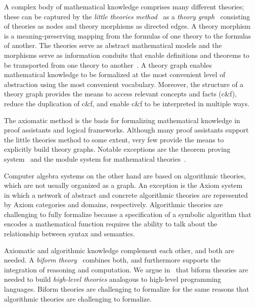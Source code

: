 \documentclass[fleqn]{llncs}
\begin{document}
A complex body of mathematical knowledge comprises many different
theories; these can be captured by the
\emph{little theories method}~\cite{FarmerEtAl92b} as a \emph{theory
  graph}~\cite{Kohlhase14} consisting of theories as nodes and theory
morphisms as directed edges.  A theory morphism is a
meaning-preserving mapping from the formulas of one theory to the
formulas of another.  The theories serve as abstract
mathematical models and the morphisms serve as information
conduits that enable definitions and theorems to be transported
from one theory to another~\cite{BarwiseSeligman97}.  A theory graph enables
mathematical knowledge to be formalized at the most convenient level
of abstraction using the most convenient vocabulary.  Moreover, the
structure of a theory graph provides the means to access relevant
concepts and facts (c\&f), reduce the duplication of c\&f, and
enable c\&f to be interpreted in multiple ways.

The axiomatic method is the basis for formalizing mathematical
knowledge in proof assistants and logical frameworks.  Although many
proof assistants support the little theories method to some extent,
very few provide the means to explicitly build theory graphs.  Notable
exceptions are the {\imps} theorem proving system~\cite{FarmerEtAl93}
and the {\mmt} module system for mathematical
theories~\cite{RabeKohlhase13}.

Computer algebra systems on the other hand are based on
algorithmic theories, which are not usually
organized as a graph.  An exception is the
Axiom system~\cite{JenksSutor92} in which a
network of abstract and concrete algorithmic theories are represented
by Axiom categories and domains, respectively.  Algorithmic theories
are challenging to fully formalize because a specification of
a symbolic algorithm that encodes a mathematical function requires
the ability to talk about the relationship between syntax and
semantics.

Axiomatic and algorithmic knowledge complement each other, and both
are needed.  A \emph{biform
  theory}~\cite{CaretteFarmer08,FarmerMohrenschildt03,Farmer07b}
combines both, and furthermore supports the integration of reasoning
and computation.  We argue in~\cite{CaretteFarmer08} that biform
theories are needed to build \emph{high-level theories} analogous to
high-level programming languages.  Biform theories are challenging to
formalize for the same reasons that algorithmic theories are
challenging to formalize.
\end{document}
